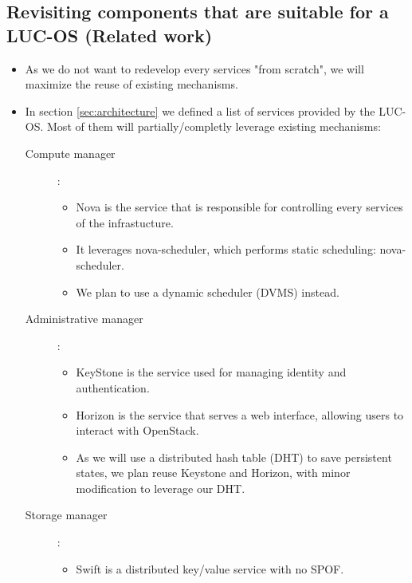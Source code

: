 \subsection{Revisiting components that are suitable for a LUC-OS (Related work)}

\begin{itemize}

	\item As we do not want to redevelop every services "from scratch", we will
	maximize the reuse of existing	mechanisms.

	\item In section \ref{sec:architecture} we defined a list of services provided 
	by the LUC-OS. Most of them will partially/completly leverage existing 
	mechanisms:

		\begin{description}

			\item [Compute manager] : 
			\begin{itemize}
				\item Nova is the service that is responsible for controlling 
				every services of the infrastucture. 

				\item It leverages nova-scheduler, which performs static 
				scheduling: nova-scheduler.

				\item We plan to use a dynamic scheduler (DVMS) instead.
			\end{itemize}

			\item [Administrative manager] : 
			\begin{itemize}
				\item KeyStone is the service used for managing identity and
				authentication.

				\item Horizon is the service that serves a web interface, 
				allowing users to interact with OpenStack.

				\item As we will use a distributed hash table (DHT) to save
				persistent states, we plan reuse Keystone and Horizon, with
				minor modification to leverage our DHT. 
			\end{itemize}

			\item [Storage manager] : 
			\begin{itemize}
				\item Swift is a distributed key/value service with no SPOF.
				

\end{itemize}
\end{description}
\end{itemize}
